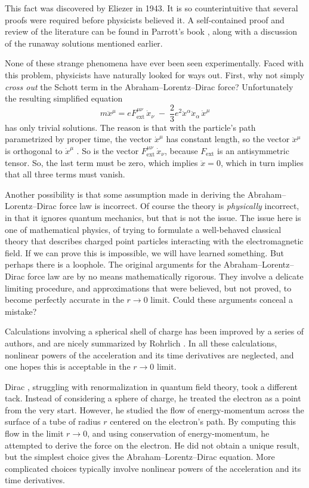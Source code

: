 \documentclass[12pt]{article}
\newcommand{\ext}{\mathrm{ext}}
\begin{document}
This fact was discovered by Eliezer \cite{Eliezer} in 1943.  It is so counterintuitive that several proofs were required before physicists believed it.  A self-contained proof and review of the literature can be found in Parrott's book \cite{Parrott}, along with a discussion of the runaway solutions mentioned earlier.

None of these strange phenomena have ever been seen experimentally.  Faced with this
problem, physicists have naturally looked for ways out.   First, why not simply \emph{cross out} the Schott term in the Abraham--Lorentz--Dirac 
force?  Unfortunately the resulting simplified equation
\[    m \ddot{x}^\mu = e F_{\ext}^{\mu \nu} \, \dot{x}_\nu   \;- \;
\frac{2}{3}e^2 \ddot{x}^\alpha \ddot{x}_\alpha \, \dot{x}^\mu \]
has only trivial solutions.  The reason is that with the particle's path parametrized by 
proper time, the vector $\dot{x}^\mu$ has constant length, so the vector $\ddot{x}^\mu$ is orthogonal to $\dot{x}^\mu$ .  So is the vector 
$F_{\ext}^{\mu \nu} \, \dot{x}_\nu$, because $F_{\ext}$ is an antisymmetric
tensor.  So, the last term must be zero, which implies $\ddot{x} = 0$, 
which in turn implies that all three terms must vanish.
 
Another possibility is that some assumption made in deriving the Abraham--Lorentz--Dirac force law is incorrect.  Of course the theory is \emph{physically} incorrect, in that it ignores quantum mechanics, but that is not the issue.  The issue here is one of mathematical physics, of trying to formulate a well-behaved classical theory that describes charged point particles interacting with the electromagnetic field.  If we can prove this is impossible, we will have learned something.  But perhaps there is a loophole. The original arguments for the Abraham--Lorentz--Dirac force law are by no means mathematically rigorous.  They involve a delicate limiting procedure, and 
approximations that were believed, but not proved, to become perfectly accurate 
in the $r \to 0$ limit.  Could these arguments conceal a mistake?  

Calculations involving a spherical shell of charge has been improved by a series of 
authors, and are nicely summarized by Rohrlich \cite{Rohrlich1997,Rohrlich1999}. 
In all these calculations, nonlinear powers of the acceleration and its time derivatives
are neglected, and one hopes this is acceptable in the $r \to 0$ limit.   

Dirac \cite{Dirac}, struggling with renormalization in quantum field theory, took a
different tack.  Instead of considering a sphere of charge, he treated the 
electron as a point from the very start.  However, he studied the flow of energy-momentum across the surface of a tube of radius $r$ centered on the electron's path.
By computing this flow in the limit $r \to 0$, and using conservation of energy-momentum, he attempted to derive the force on the electron.  He did not obtain a 
unique result, but the simplest choice gives the Abraham--Lorentz--Dirac equation.  
More complicated choices typically involve nonlinear powers of the acceleration and its time derivatives.
\end{document}
